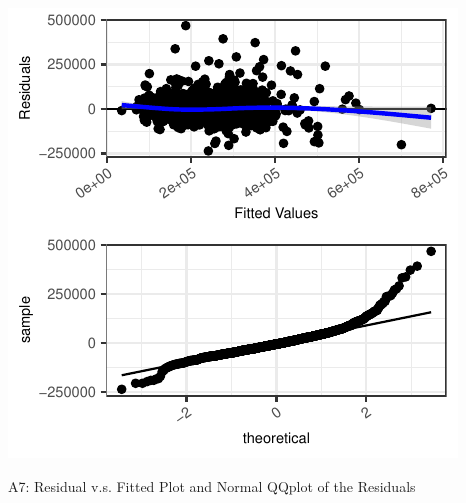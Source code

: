 \documentclass[letterpaper,9pt,twocolumn,twoside,]{pinp}
\begin{document}
\begin{center}\includegraphics{Report_files/figure-latex/unnamed-chunk-25-1} \end{center}
\centerline{\small A7: Residual v.s. Fitted Plot and Normal QQplot of the Residuals}

\end{document}

